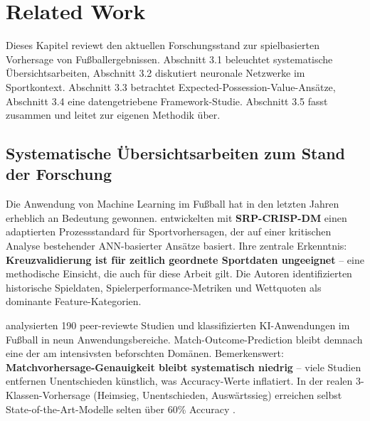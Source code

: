 
\chapter{Related Work}\label{chap:relatedwork}

Dieses Kapitel reviewt den aktuellen Forschungsstand zur spielbasierten Vorhersage von Fußballergebnissen. Abschnitt 3.1 beleuchtet systematische Übersichtsarbeiten, Abschnitt 3.2 diskutiert neuronale Netzwerke im Sportkontext. Abschnitt 3.3 betrachtet Expected-Possession-Value-Ansätze, Abschnitt 3.4 eine datengetriebene Framework-Studie. Abschnitt 3.5 fasst zusammen und leitet zur eigenen Methodik über.

\section{Systematische Übersichtsarbeiten zum Stand der Forschung}
\label{sec:systematic-reviews}

Die Anwendung von Machine Learning im Fußball hat in den letzten Jahren erheblich an Bedeutung gewonnen. \textcite{Bunker2017} entwickelten mit \textbf{SRP-CRISP-DM} einen adaptierten Prozessstandard für Sportvorhersagen, der auf einer kritischen Analyse bestehender ANN-basierter Ansätze basiert. Ihre zentrale Erkenntnis: \textbf{Kreuzvalidierung ist für zeitlich geordnete Sportdaten ungeeignet} -- eine methodische Einsicht, die auch für diese Arbeit gilt. Die Autoren identifizierten historische Spieldaten, Spielerperformance-Metriken und Wettquoten als dominante Feature-Kategorien.

\textcite{DubitzkyEtAl2024} analysierten 190 peer-reviewte Studien und klassifizierten KI-Anwendungen im Fußball in neun Anwendungsbereiche. Match-Outcome-Prediction bleibt demnach eine der am intensivsten beforschten Domänen. Bemerkenswert: \textbf{Matchvorhersage-Genauigkeit bleibt systematisch niedrig} -- viele Studien entfernen Unentschieden künstlich, was Accuracy-Werte inflatiert. In der realen 3-Klassen-Vorhersage (Heimsieg, Unentschieden, Auswärtssieg) erreichen selbst State-of-the-Art-Modelle selten über 60\% Accuracy \cite{DobsonGoddard2011,HubacekSourekZelezny2019}.

